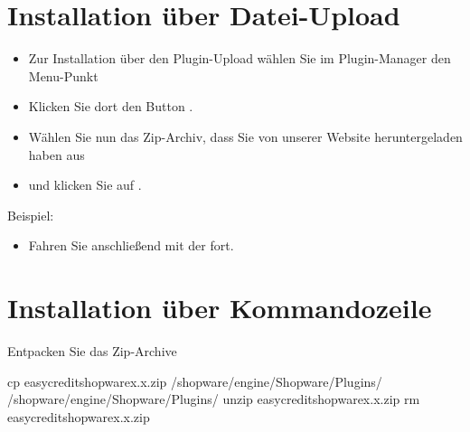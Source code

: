 \documentclass[a4paper,10pt,openany,oneside,ngerman]{sphinxmanual}
\begin{document}
\section{Installation über Datei-Upload}
\label{\detokenize{installation:installation-uber-datei-upload}}
\noindent{}
\begin{itemize}
\item {} 
Zur Installation über den Plugin-Upload wählen Sie im Plugin-Manager den Menu-Punkt 

\item {} 
Klicken Sie dort den Button .

\item {} 
Wählen Sie nun das Zip-Archiv, dass Sie von unserer Website heruntergeladen haben aus

\item {} 
und klicken Sie auf .

\end{itemize}

Beispiel:
\begin{quote}

\end{quote}
\begin{itemize}
\item {} 
Fahren Sie anschließend mit der  fort.

\end{itemize}


\section{Installation über Kommandozeile}
\label{\detokenize{installation:installation-uber-kommandozeile}}
Entpacken Sie das Zip-Archive

%
\begin{sphinxVerbatim}[commandchars=\\\{\}]
cp easycredit\PYGZhy{}shopware\PYGZhy{}x.x.zip /shopware/engine/Shopware/Plugins/
 /shopware/engine/Shopware/Plugins/
unzip easycredit\PYGZhy{}shopware\PYGZhy{}x.x.zip
rm easycredit\PYGZhy{}shopware\PYGZhy{}x.x.zip
\end{sphinxVerbatim}
\end{document}
